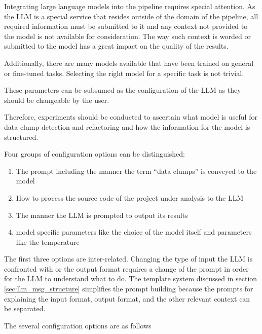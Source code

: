 Integrating large language models into the pipeline requires special attention. As the \ac{LLM} is a special service that resides outside of the domain of the pipeline, all required information must be submitted to it and any context not provided to the model is not available for consideration. The way such context is worded or submitted to the model has a great impact on the quality of the results.

Additionally, there are many models available that have been trained on general or fine-tuned  tasks. Selecting the right model for a specific task is not trivial. 

These parameters can be subsumed as the configuration of the \ac{LLM} as they should be changeable by the user. 

Therefore, experiments should be conducted to ascertain what model is useful for data clump detection and refactoring and how the information for the model is structured.  

Four groups of configuration options can be distinguished:
\begin{enumerate}
    \item The prompt including the manner the term \enquote{data clumps} is conveyed to the model
    \item How to process the source code of the project under analysis to the \ac{LLM}
    \item The manner the LLM is prompted to output its results
    \item model specific parameters like the choice of the model itself and parameters like the temperature
\end{enumerate}

The first three options are inter-related. Changing the type of input the LLM is confronted with or the output format requires a change of the prompt in order for the LLM to understand what to do. The template system discussed in section \ref{sec:llm_msg_structure} simplifies the prompt building because the prompts for explaining the input format, output format, and the other relevant context can be separated.

The several configuration options are as follows















